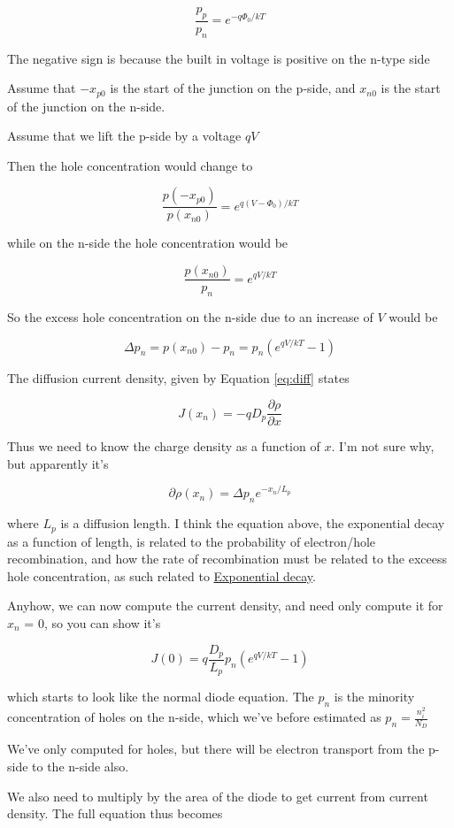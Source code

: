 \[
\frac{p_p}{p_n} = e^{-q\Phi_0/kT}
\]

The negative sign is because the built in voltage is positive on the
n-type side

Assume that \(-x_{p0}\) is the start of the junction on the p-side, and
\(x_{n0}\) is the start of the junction on the n-side.

Assume that we lift the p-side by a voltage \(qV\)

Then the hole concentration would change to

\[
\frac{p(-x_{p0})}{p(x_{n0})} = e^{q(V-\Phi_0)/kT}
\]

while on the n-side the hole concentration would be

\[
\frac{p(x_{n0})}{p_n} = e^{qV/kT}
\]

So the excess hole concentration on the n-side due to an increase of
\(V\) would be

\[
\Delta p_n = p(x_{n0}) - p_n = p_n\left( e^{qV/kT} -1 \right)
\]

The diffusion current density, given by Equation \eqref{eq:diff} states

\[
J(x_n) = -q D_p \frac{\partial \rho}{\partial x} 
\]

Thus we need to know the charge density as a function of \(x\). I'm not
sure why, but apparently it's

\[
\partial \rho(x_n) = \Delta p_n e^{-x_n/L_p}
\]

where \(L_p\) is a diffusion length. I think the equation above, the
exponential decay as a function of length, is related to the probability
of electron/hole recombination, and how the rate of recombination must
be related to the exceess hole concentration, as such related to
\href{https://en.wikipedia.org/wiki/Exponential_decay}{Exponential
decay}.

Anyhow, we can now compute the current density, and need only compute it
for \(x_n\) = 0, so you can show it's

\[
J(0) = q\frac{D_p}{L_p} p_n \left( e^{qV/kT} - 1\right)
\]

which starts to look like the normal diode equation. The \(p_n\) is the
minority concentration of holes on the n-side, which we've before
estimated as \(p_n =
\frac{n_i^2}{N_D}\)

We've only computed for holes, but there will be electron transport from
the p-side to the n-side also.

We also need to multiply by the area of the diode to get current from
current density. The full equation thus becomes

